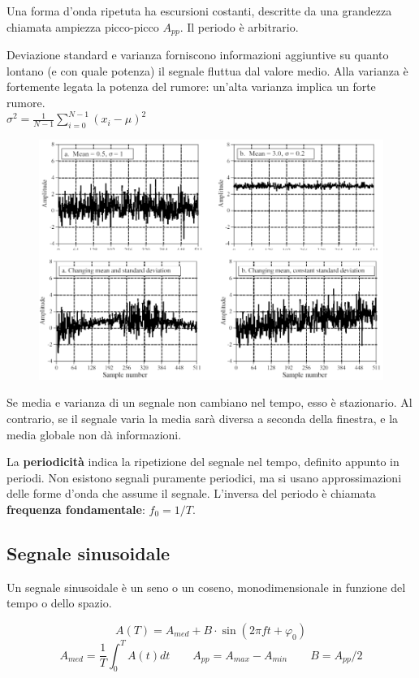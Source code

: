 Una forma d'onda ripetuta ha escursioni costanti, descritte da una grandezza chiamata ampiezza picco-picco $A_{pp}$. Il periodo è arbitrario.

Deviazione standard e varianza forniscono informazioni aggiuntive su quanto lontano (e con quale potenza) il segnale fluttua dal valore medio. Alla varianza è fortemente legata la potenza del rumore: un'alta varianza implica un forte rumore. \\
$\sigma^2 = \frac{1}{N - 1} \sum_{i = 0}^{N - 1} (x_i - \mu)^2$

\begin{figure}[h]
	\centering
	\includegraphics[scale=0.48]{Lezioni/Immagini/mediavarianza}
\end{figure}

Se media e varianza di un segnale non cambiano nel tempo, esso è stazionario. Al contrario, se il segnale varia la media sarà diversa a seconda della finestra, e la media globale non dà informazioni.

La \textbf{periodicità} indica la ripetizione del segnale nel tempo, definito appunto in periodi. Non esistono segnali puramente periodici, ma si usano approssimazioni delle forme d'onda che assume il segnale. L'inversa del periodo è chiamata \textbf{frequenza fondamentale}: $f_0 = 1/T$. 

\subsection{Segnale sinusoidale}
Un segnale sinusoidale è un seno o un coseno, monodimensionale in funzione del tempo o dello spazio.

$$A(T) = A_{med} + B \cdot \sin(2\pi ft + \varphi_0)$$
$$A_{med} = \frac{1}{T} \int_{0}^{T} A(t) dt \qquad A_{pp} = A_{max} - A_{min} \qquad B = A_{pp} / 2$$

